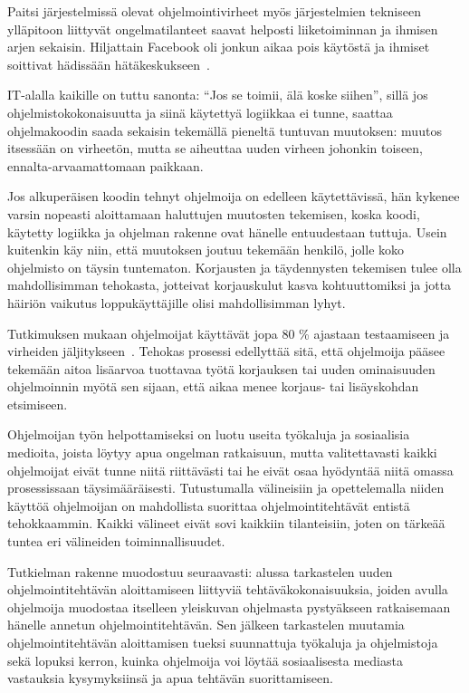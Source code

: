 \documentclass[finnish]{tktltiki2}
\theoremstyle{definition}
\theoremstyle{remark}
\begin{document}
Paitsi järjestelmissä olevat ohjelmointivirheet myös järjestelmien tekniseen ylläpitoon liittyvät ongelmatilanteet saavat helposti liiketoiminnan ja ihmisen arjen sekaisin. Hiljattain Facebook oli jonkun aikaa pois käytöstä ja ihmiset soittivat hädissään hätäkeskukseen~\cite{facebook-down}.

IT-alalla kaikille on tuttu sanonta: ``Jos se toimii, älä koske siihen'', sillä jos ohjelmistokokonaisuutta ja siinä käytettyä logiikkaa ei tunne, saattaa ohjelmakoodin saada sekaisin tekemällä pieneltä tuntuvan muutoksen: muutos itsessään on virheetön, mutta se aiheuttaa uuden virheen johonkin toiseen, ennalta-arvaamattomaan paikkaan.


Jos alkuperäisen koodin tehnyt ohjelmoija on edelleen käytettävissä, hän kykenee varsin nopeasti aloittamaan haluttujen muutosten tekemisen, koska koodi, käytetty logiikka ja ohjelman rakenne ovat hänelle entuudestaan tuttuja. Usein kuitenkin käy niin, että muutoksen joutuu tekemään henkilö, jolle koko ohjelmisto on täysin tuntematon.
Korjausten ja täydennysten tekemisen tulee olla mahdollisimman tehokasta, jotteivat korjauskulut kasva kohtuuttomiksi ja jotta häiriön vaikutus loppukäyttäjille olisi mahdollisimman lyhyt.

Tutkimuksen mukaan ohjelmoijat käyttävät jopa 80 \% ajastaan testaamiseen ja virheiden jäljitykseen~\cite{debugging-is-expensive}.
Tehokas prosessi edellyttää sitä, että ohjelmoija pääsee tekemään aitoa lisäarvoa tuottavaa työtä korjauksen tai uuden ominaisuuden ohjelmoinnin myötä sen sijaan, että aikaa menee korjaus- tai lisäyskohdan etsimiseen.

Ohjelmoijan työn helpottamiseksi on luotu useita työkaluja ja sosiaalisia medioita, joista löytyy apua ongelman ratkaisuun, mutta valitettavasti kaikki ohjelmoijat eivät tunne niitä riittävästi tai he eivät osaa hyödyntää niitä omassa prosessissaan täysimääräisesti. Tutustumalla välineisiin ja opettelemalla niiden käyttöä ohjelmoijan on mahdollista suorittaa ohjelmointitehtävät entistä tehokkaammin. Kaikki välineet eivät sovi kaikkiin tilanteisiin, joten on tärkeää tuntea eri välineiden toiminnallisuudet.

Tutkielman rakenne muodostuu seuraavasti: alussa tarkastelen uuden ohjelmointitehtävän aloittamiseen liittyviä tehtäväkokonaisuuksia, joiden avulla ohjelmoija muodostaa itselleen yleiskuvan ohjelmasta pystyäkseen ratkaisemaan hänelle annetun ohjelmointitehtävän. Sen jälkeen tarkastelen muutamia ohjelmointitehtävän aloittamisen tueksi suunnattuja työkaluja ja ohjelmistoja sekä lopuksi kerron, kuinka ohjelmoija voi löytää sosiaalisesta mediasta vastauksia kysymyksiinsä ja apua tehtävän suorittamiseen.
\end{document}
